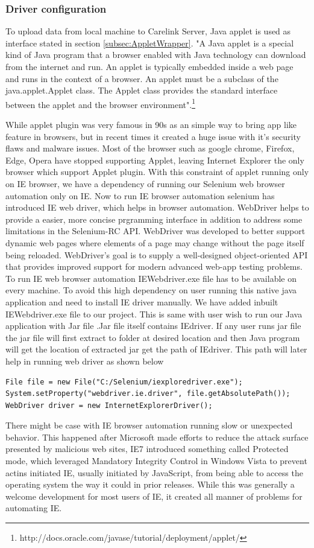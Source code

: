 \documentclass[article,type=msc,colorback,accentcolor=tud9c,twoside,11pt]{tudthesis}
\begin{document}
\subsubsection{Driver configuration}
To upload data from local machine to Carelink Server, Java applet is  used as interface stated in section \ref{subsec:AppletWrapper}. "A Java applet is a special kind of Java program that a browser enabled with Java technology can download from the internet and run. An applet is typically embedded inside a web page and runs in the context of a browser. An applet must be a subclass of the java.applet.Applet class. The Applet class provides the standard interface between the applet and the browser environment".\footnote{http://docs.oracle.com/javase/tutorial/deployment/applet/}

While applet plugin was very famous in 90s as an simple way to bring app like feature in browsers, but in recent times it created a huge issue with it's security flaws and malware issues. Most of the browser such as google chrome, Firefox, Edge, Opera have stopped supporting Applet, leaving Internet Explorer the only browser which support Applet plugin.
With this constraint of applet running only on IE browser, we have a dependency of running our Selenium web browser automation only on IE. Now to run IE browser automation selenium has introduced IE web driver, which helps in browser automation. WebDriver helps to provide a easier, more concise prgramming interface in addition to address some limitations in the Selenium-RC API. WebDriver was developed to better support dynamic web pages where elements of a page may change without the page itself being reloaded. WebDriver's goal is to supply a well-designed object-oriented API that provides improved support for modern advanced web-app testing problems. To run IE web browser automation IEWebdriver.exe file has to be available on every machine. To avoid this high dependency on user running this native java application and need to install IE driver manually. We have added inbuilt IEWebdriver.exe file to our project. This is same with user wish to run our Java application with Jar file .Jar file itself contains IEdriver. If any user runs jar file the jar file will first extract to folder at desired location and then Java program will get the location of extracted jar get the path of IEdriver. This path will later help in running web driver as shown below
\begin{lstlisting}
File file = new File("C:/Selenium/iexploredriver.exe");
System.setProperty("webdriver.ie.driver", file.getAbsolutePath());
WebDriver driver = new InternetExplorerDriver();
\end{lstlisting}
There might be case with IE browser automation running slow or unexpected behavior. This happened after Microsoft made efforts to reduce the attack surface presented by malicious web sites, IE7 introduced something called Protected mode, which leveraged Mandatory Integrity Control in Windows Vista to prevent actins initiated IE, usually initiated by JavaScript, from being able to access the operating system the way it could in prior releases. While this was generally a welcome development for most users of IE, it created all manner of problems for automating IE.
\end{document}
